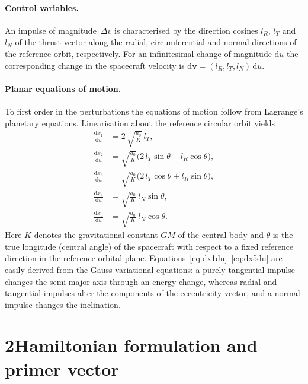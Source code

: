 \documentclass[12pt]{article}
\begin{document}
\paragraph{Control variables.}  An impulse of magnitude~$\Delta v$ is
characterised by the direction cosines $l_R$, $l_T$ and~$l_N$ of the
thrust vector along the radial, circumferential and normal directions
of the reference orbit, respectively.  For an infinitesimal change of
magnitude $\mathrm{d}u$ the corresponding change in the spacecraft
velocity is $\mathrm{d}\mathbf{v} = (l_R, l_T, l_N)\,\mathrm{d}u$.

\paragraph{Planar equations of motion.}  To first order in the
perturbations the equations of motion follow from Lagrange's planetary
equations.  Linearisation about the reference circular orbit yields
\begin{align}
  \frac{\mathrm{d}x_1}{\mathrm{d}u} &= 2\,\sqrt{\frac{a_0}{K}}\,l_T,
    \tag{1}\label{eq:dx1du}\\
  \frac{\mathrm{d}x_2}{\mathrm{d}u} &= \sqrt{\frac{a_0}{K}}
    \bigl(2\,l_T\sin\theta - l_R\cos\theta\bigr),
    \tag{2}\label{eq:dx2du}\\
  \frac{\mathrm{d}x_3}{\mathrm{d}u} &= \sqrt{\frac{a_0}{K}}
    \bigl(2\,l_T\cos\theta + l_R\sin\theta\bigr),
    \tag{3}\label{eq:dx3du}\\
  \frac{\mathrm{d}x_4}{\mathrm{d}u} &= \sqrt{\frac{a_0}{K}}\,l_N\sin\theta,
    \tag{4}\label{eq:dx4du}\\
  \frac{\mathrm{d}x_5}{\mathrm{d}u} &= \sqrt{\frac{a_0}{K}}\,l_N\cos\theta.
    \tag{5}\label{eq:dx5du}
\end{align}
Here $K$ denotes the gravitational constant $GM$ of the central body
and $\theta$ is the true longitude (central angle) of the spacecraft
with respect to a fixed reference direction in the reference orbital
plane.  Equations~\eqref{eq:dx1du}--\eqref{eq:dx5du} are easily
derived from the Gauss variational equations: a purely tangential
impulse changes the semi-major axis through an energy change,
whereas radial and tangential impulses alter the components of the
eccentricity vector, and a normal impulse changes the inclination.

\section*{2\quad Hamiltonian formulation and primer vector}
\end{document}
